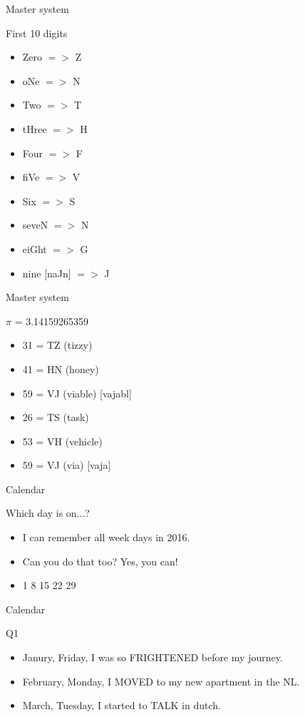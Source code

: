 \begin{frame}{Master system}
  \begin{block}{First 10 digits}
    \begin{itemize}
      \item Zero $=>$ Z
      \item oNe $=>$ N
      \item Two $=>$ T
      \item tHree $=>$ H
      \item Four $=>$ F
      \item fiVe $=>$ V
      \item Six $=>$ S
      \item seveN $=>$ N
      \item eiGht $=>$ G
      \item nine [naJn] $=>$ J 
    \end{itemize}
  \end{block}
\end{frame}

\begin{frame}{Master system}
  \begin{block}{$\pi$ = 3.14159265359}
    \begin{itemize}
      \item 31 = TZ (tizzy)
      \item 41 = HN (honey)
      \item 59 = VJ (viable) [vajabl]
      \item 26 = TS (task)
      \item 53 = VH (vehicle)
      \item 59 = VJ (via) [vaja]
    \end{itemize}
  \end{block}
\end{frame}

\begin{frame}{Calendar}
  \begin{block}{Which day is on...?}
    \begin{itemize}
      \item I can remember all week days in 2016. 
      \item Can you do that too? Yes, you can!
      \item 1 8 15 22 29
    \end{itemize}
  \end{block}
\end{frame}

\begin{frame}{Calendar}
  \begin{block}{Q1}
    \begin{itemize}
      \item Janury, Friday, I was so FRIGHTENED before my journey.
      \item February, Monday, I MOVED to my new apartment in the NL. 
      \item March, Tuesday, I started to TALK in dutch. 
    \end{itemize}
  \end{block}
\end{frame}


